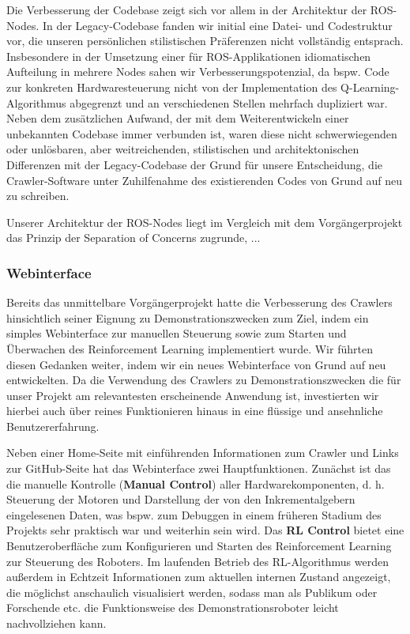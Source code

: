Die Verbesserung der Codebase zeigt sich vor allem in der Architektur der ROS-Nodes. In der Legacy-Codebase fanden wir initial eine Datei- und Codestruktur vor, die unseren persönlichen stilistischen Präferenzen nicht vollständig entsprach. Insbesondere in der Umsetzung einer für ROS-Applikationen idiomatischen Aufteilung in mehrere Nodes sahen wir Verbesserungspotenzial, da bspw. Code zur konkreten Hardwaresteuerung nicht von der Implementation des Q-Learning-Algorithmus abgegrenzt und an verschiedenen Stellen mehrfach dupliziert war. Neben dem zusätzlichen Aufwand, der mit dem Weiterentwickeln einer unbekannten Codebase immer verbunden ist, waren diese nicht schwerwiegenden oder unlösbaren, aber weitreichenden, stilistischen und architektonischen Differenzen mit der Legacy-Codebase der Grund für unsere Entscheidung, die Crawler-Software unter Zuhilfenahme des existierenden Codes von Grund auf neu zu schreiben. 

Unserer Architektur der ROS-Nodes liegt im Vergleich mit dem Vorgängerprojekt das Prinzip der Separation of Concerns zugrunde, ...

\subsubsection{Webinterface}

Bereits das unmittelbare Vorgängerprojekt hatte die Verbesserung des Crawlers hinsichtlich seiner Eignung zu Demonstrationszwecken zum Ziel, indem ein simples Webinterface zur manuellen Steuerung sowie zum Starten und Überwachen des Reinforcement Learning implementiert wurde. Wir führten diesen Gedanken weiter, indem wir ein neues Webinterface von Grund auf neu entwickelten. Da die Verwendung des Crawlers zu Demonstrationszwecken die für unser Projekt am relevantesten erscheinende Anwendung ist, investierten wir hierbei auch über reines Funktionieren hinaus in eine flüssige und ansehnliche Benutzererfahrung. 

Neben einer Home-Seite mit einführenden Informationen zum Crawler und Links zur GitHub-Seite hat das Webinterface zwei Hauptfunktionen. Zunächst ist das die manuelle Kontrolle (\textbf{Manual Control}) aller Hardwarekomponenten, d. h. Steuerung der Motoren und Darstellung der von den Inkrementalgebern eingelesenen Daten, was bspw. zum Debuggen in einem früheren Stadium des Projekts sehr praktisch war und weiterhin sein wird. Das \textbf{RL Control} bietet eine Benutzeroberfläche zum Konfigurieren und Starten des Reinforcement Learning zur Steuerung des Roboters. Im laufenden Betrieb des RL-Algorithmus werden außerdem in Echtzeit Informationen zum aktuellen internen Zustand angezeigt, die möglichst anschaulich visualisiert werden, sodass man als Publikum oder Forschende etc. die Funktionsweise des Demonstrationsroboter leicht nachvollziehen kann.

